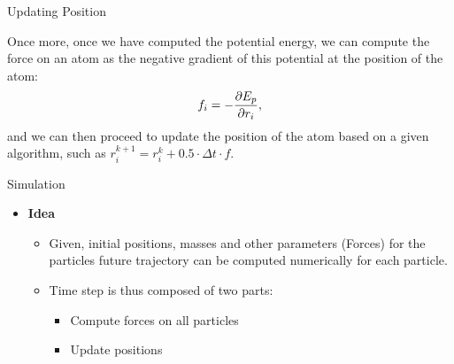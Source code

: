 \documentclass[aspectratio=169]{beamer}
\begin{document}
\begin{frame}[fragile]{Updating Position}

Once more, once we have computed the potential energy, we can compute the force on an atom as the negative gradient of this potential at the position of the atom:
%
\begin{equation}
	f_i = -\frac{\partial E_p}{\partial \*r_i},
\end{equation}
%
and we can then proceed to update the position of the atom based on a given algorithm, such as $r_i^{k+1} = r_i^{k} + 0.5 \cdot \Delta t \cdot f$.

\end{frame}




\begin{frame}[fragile]{Simulation}

\begin{itemize}
\item \textbf{Idea}
\begin{itemize}
\item Given, initial positions, masses and other parameters (Forces) for the particles future trajectory can be computed numerically for each particle.
\item Time step is thus composed of two parts:
\begin{itemize}
\item Compute forces on all particles
\item Update positions
\end{itemize}
\end{itemize}
\end{itemize}


\end{frame}
\end{document}

